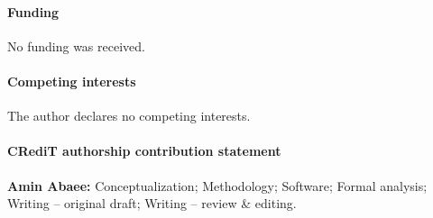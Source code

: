 \documentclass[preprint,12pt,authoryear]{elsarticle}
\begin{document}
\paragraph{Funding} No funding was received.

\paragraph{Competing interests} The author declares no competing interests.

\paragraph{CRediT authorship contribution statement} \textbf{Amin Abaee:} Conceptualization; Methodology; Software; Formal analysis; Writing -- original draft; Writing -- review \& editing.
\end{document}
